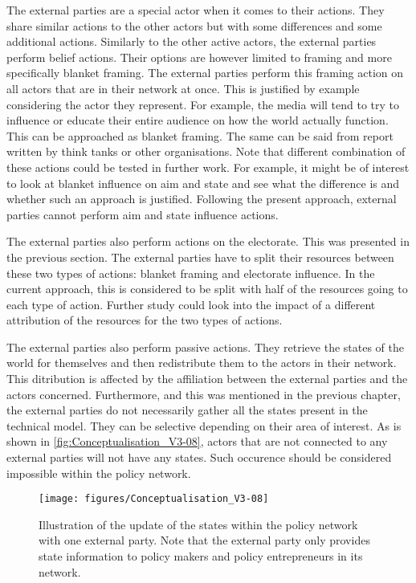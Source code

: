 The external parties are a special actor when it comes to their actions. They share similar actions to the other actors but with some differences and some additional actions. Similarly to the other active actors, the external parties perform belief actions. Their options are however limited to framing and more specifically blanket framing. The external parties perform this framing action on all actors that are in their network at once. This is justified by example considering the actor they represent. For example, the media will tend to try to influence or educate their entire audience on how the world actually function. This can be approached as blanket framing. The same can be said from report written by think tanks or other organisations. Note that different combination of these actions could be tested in further work. For example, it might be of interest to look at blanket influence on aim and state and see what the difference is and whether such an approach is justified. Following the present approach, external parties cannot perform aim and state influence actions.

The external parties also perform actions on the electorate. This was presented in the previous section. The external parties have to split their resources between these two types of actions: blanket framing and electorate influence. In the current approach, this is considered to be split with half of the resources going to each type of action. Further study could look into the impact of a different attribution of the resources for the two types of actions.

The external parties also perform passive actions. They retrieve the states of the world for themselves and then redistribute them to the actors in their network. This ditribution is affected by the affiliation between the external parties and the actors concerned.  Furthermore, and this was mentioned in the previous chapter, the external parties do not necessarily gather all the states present in the technical model. They can be selective depending on their area of interest. As is shown in \autoref{fig:Conceptualisation_V3-08}, actors that are not connected to any external parties will not have any states. Such occurence should be considered impossible within the policy network.

\begin{figure}
\centering
\texttt{[image: figures/Conceptualisation\_V3-08]}
\caption{Illustration of the update of the states within the policy network with one external party. Note that the external party only provides state information to policy makers and policy entrepreneurs in its network.}
\label{fig:Conceptualisation_V3-08}
\end{figure}

